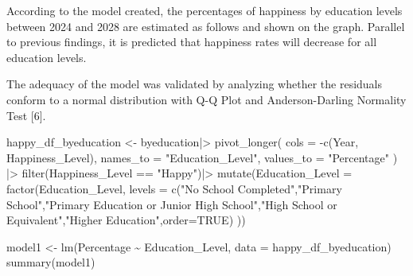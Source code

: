\documentclass[
  11pt,
  a4paper,
  DIV=11,
  numbers=noendperiod]{scrartcl}
\newenvironment{Shaded}{\begin{snugshade}}{\end{snugshade}}
\newcommand{\AttributeTok}[1]{\textcolor[rgb]{0.40,0.45,0.13}{#1}}
\newcommand{\ConstantTok}[1]{\textcolor[rgb]{0.56,0.35,0.01}{#1}}
\newcommand{\FunctionTok}[1]{\textcolor[rgb]{0.28,0.35,0.67}{#1}}
\newcommand{\NormalTok}[1]{\textcolor[rgb]{0.00,0.23,0.31}{#1}}
\newcommand{\OtherTok}[1]{\textcolor[rgb]{0.00,0.23,0.31}{#1}}
\newcommand{\SpecialCharTok}[1]{\textcolor[rgb]{0.37,0.37,0.37}{#1}}
\newcommand{\StringTok}[1]{\textcolor[rgb]{0.13,0.47,0.30}{#1}}
\begin{document}
According to the model created, the percentages of happiness by
education levels between 2024 and 2028 are estimated as follows and
shown on the graph. Parallel to previous findings, it is predicted that
happiness rates will decrease for all education levels.

The adequacy of the model was validated by analyzing whether the
residuals conform to a normal distribution with Q-Q Plot and
Anderson-Darling Normality Test {[}6{]}.

\begin{Shaded}
\begin{Highlighting}[]
\NormalTok{happy\_df\_byeducation  }\OtherTok{\textless{}{-}}\NormalTok{ byeducation}\SpecialCharTok{|\textgreater{}}
  \FunctionTok{pivot\_longer}\NormalTok{(}
    \AttributeTok{cols =} \SpecialCharTok{{-}}\FunctionTok{c}\NormalTok{(Year, Happiness\_Level),}
    \AttributeTok{names\_to =} \StringTok{"Education\_Level"}\NormalTok{,}
    \AttributeTok{values\_to =} \StringTok{"Percentage"}
\NormalTok{  ) }\SpecialCharTok{|\textgreater{}}
  \FunctionTok{filter}\NormalTok{(Happiness\_Level }\SpecialCharTok{==} \StringTok{"Happy"}\NormalTok{)}\SpecialCharTok{|\textgreater{}}
\FunctionTok{mutate}\NormalTok{(}\AttributeTok{Education\_Level =} \FunctionTok{factor}\NormalTok{(Education\_Level, }
                                  \AttributeTok{levels =} \FunctionTok{c}\NormalTok{(}\StringTok{"No School Completed"}\NormalTok{,}\StringTok{"Primary School"}\NormalTok{,}\StringTok{"Primary Education or Junior High School"}\NormalTok{,}\StringTok{"High School or Equivalent"}\NormalTok{,}\StringTok{"Higher Education"}\NormalTok{,}\AttributeTok{order=}\ConstantTok{TRUE}\NormalTok{)}
\NormalTok{))}

\NormalTok{model1 }\OtherTok{\textless{}{-}} \FunctionTok{lm}\NormalTok{(Percentage }\SpecialCharTok{\textasciitilde{}}\NormalTok{ Education\_Level, }\AttributeTok{data =}\NormalTok{ happy\_df\_byeducation)}
\FunctionTok{summary}\NormalTok{(model1)}
\end{Highlighting}
\end{Shaded}
\end{document}
